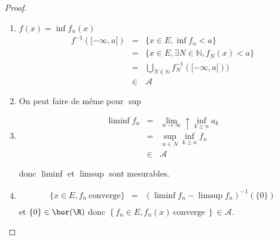 \begin{proof}
	\begin{enumerate}
		\item $f(x) = \inf f_n (x)$
		      \begin{eqnarray*}
			      f^{-1}([-\infty, a[) &=& \{x \in E, \inf f_n < a\} \\
			      &=& \{x \in E, \exists N \in \mathbb{N}, f_N (x) < a \}\\
			      &=& \bigcup\limits_{N\in \mathbb{N}}f_N^{-1}([-\infty, a[))\\
			      &\in& \mathscr{A}
		      \end{eqnarray*}
		\item On peut faire de même pour $\sup$
		\item \begin{eqnarray*}
			      \liminf f_n &=& \lim\limits_{n \to \infty}\uparrow \inf\limits_{k \geq n } a_k\\
			      &=& \sup _{n\in N} \inf_{k \geq n} f_n\\
			      &\in& \mathscr{A}
		      \end{eqnarray*}

		      donc $\liminf$ et $\limsup$ sont mesurables.
		\item
		      \begin{eqnarray*}
			      \{x \in E, f_n \  \text{converge} \}  &=& (\liminf f_n - \limsup f_n)^{-1}(\{0\})\\
		      \end{eqnarray*}
		      et $\{ 0 \} \in \bor(\R)$ donc $\left\{ f_n \in E, f_n(x) \ \text{converge} \ \right\} \in \mathscr{A}$.
	\end{enumerate}

\end{proof}
